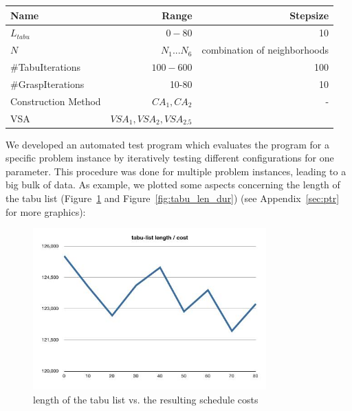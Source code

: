 \documentclass[a4paper,11pt]{article}
\begin{document}
\begin{center}
\begin{tabular}{| l | r |r | }
  \hline
  Name & Range & Stepsize \\   \hline     \hline
  $L_{tabu}$ &  $0-80$& 10\\ \hline
  $N$ &  $N_1 ... N_6$ & combination of neighborhoods\\ \hline
  \#TabuIterations & $100-600$  & 100 \\ \hline
  \#GraspIterations &  10-80 & 10  \\ \hline
  Construction Method &  $CA_1, CA_2 $& - \\ \hline
  VSA & $ VSA_1, VSA_2, VSA_{2.5}$  & \\ \hline
\end{tabular}
\end{center}

We developed an automated test program which evaluates the program for a specific problem instance
by iteratively testing different configurations for one parameter. This procedure was done for multiple problem instances, leading to a big bulk of data.
As example, we plotted some aspects concerning the length of the tabu list (Figure~\ref{fig:tabu_len_cost} and Figure~\ref{fig:tabu_len_dur})
(see Appendix~\ref{sec:ptr} for more graphics):

\begin{figure}[h!tb]
  \begin{center}
    \includegraphics[width=0.8\textwidth]{images/tabulist-len-cost}
  \end{center}
  \caption{length of the tabu list vs. the resulting schedule costs}
  \label{fig:tabu_len_cost}
\end{figure}
\end{document}
